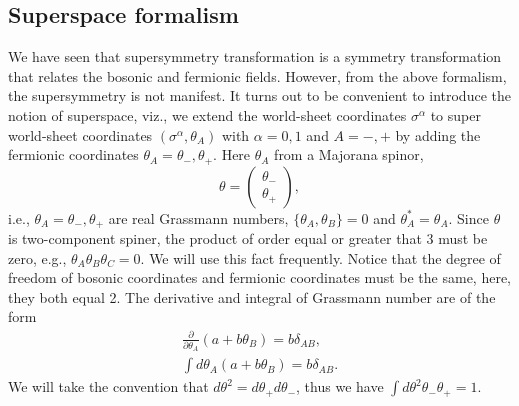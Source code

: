\documentclass[graybox,envcountchap,sectrefs]{svmono}
\begin{document}
\subsection{Superspace formalism}
We have seen that supersymmetry transformation is a symmetry transformation that relates the bosonic and fermionic fields. 
However, from the above formalism, the supersymmetry is not manifest. 
It turns out to be convenient to introduce the notion of superspace, viz., we extend the world-sheet coordinates $\sigma^{\alpha}$ to super world-sheet coordinates $(\sigma^{\alpha},\theta_A)$ with $\alpha=0,1$ and $A=-,+$ by adding the fermionic coordinates $\theta_A=\theta_{-},\theta_{+}$. Here $\theta_A$ from a Majorana spinor,
\begin{equation}
\theta=\left(
\begin{array}{cc}
\theta_{-}\\
\theta_{+}
\end{array}
\right),
\end{equation}
i.e., $\theta_A=\theta_{-},\theta_{+}$ are real Grassmann numbers, $\{\theta_A,\theta_B\}=0$ and $\theta_A^*=\theta_A$. Since $\theta$ is two-component spiner, the product of order equal or greater that 3 must be zero, e.g., $\theta_A\theta_B\theta_C=0$. We will use this fact frequently.
Notice that the degree of freedom of bosonic coordinates and fermionic coordinates must be the same, here, they both equal 2.
The derivative and integral of Grassmann number are of the form
\begin{align}
\frac{\partial}{\partial \theta_A}(a+b\theta_B)=b\delta_{AB},\\
	\int d\theta_A(a+b\theta_B)=b\delta_{AB}.
\end{align}
We will take the convention that $d\theta^2=d\theta_{+}d\theta_{-}$, thus we have $\int d\theta^2\theta_{-}\theta_{+}=1$.
\end{document}
